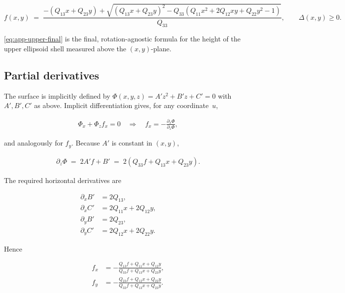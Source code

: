 \begin{equation}
    \label{eq:app-upper-final}
    f(x,y)\;=\;
    \frac{
    -\left(Q_{13}x+Q_{23}y\right)
    +\sqrt{
        \left(Q_{13}x+Q_{23}y\right)^{2}
        -Q_{33}\left(Q_{11}x^{2}+2Q_{12}xy+Q_{22}y^{2}-1\right)
    }
    }{Q_{33}},
    \qquad
    \Delta(x,y)\ge 0.
\end{equation}

\cref{eq:app-upper-final} is the final, rotation-agnostic formula for the height of the upper ellipsoid shell measured above the $(x,y)$-plane.

\subsection*{Partial derivatives}

The surface is implicitly defined by $\Phi(x,y,z)=A'z^{2}+B'z+C'=0$ with $A',B',C'$ as above. Implicit differentiation gives, for any coordinate~$u$,

\begin{align}
    \Phi_x + \Phi_z f_x = 0
    \quad\Longrightarrow\quad
    f_x = -\frac{\partial_x\Phi}{\partial_z\Phi},
\end{align}

and analogously for $f_y$. Because $A'$ is constant in $(x,y)$,

\begin{align}
\partial_z\Phi \;=\; 2A'f + B' 
                 \;=\; 2\left(Q_{33}f + Q_{13}x+Q_{23}y\right).
\end{align}

The required horizontal derivatives are

\begin{align}
    \partial_x B' &= 2Q_{13}, &\qquad \\
    \partial_x C' &= 2Q_{11}x + 2Q_{12}y,\\
    \partial_y B' &= 2Q_{23}, &\qquad \\
    \partial_y C' &= 2Q_{12}x + 2Q_{22}y.
\end{align}

Hence

\begin{align}
    \label{eq:app-fx}
    f_x &= -\frac{Q_{13}f + Q_{11}x + Q_{12}y}{Q_{33}f + Q_{13}x + Q_{23}y}, \\
    \label{eq:app-fy}
    f_y &= -\frac{Q_{23}f + Q_{12}x + Q_{22}y}{Q_{33}f + Q_{13}x + Q_{23}y}.
\end{align}

